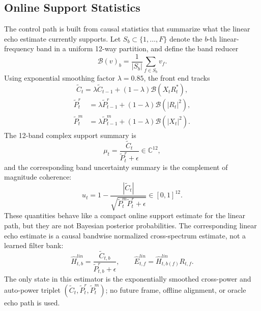 \documentclass[journal]{IEEEtran}
\begin{document}
\subsection{Online Support Statistics}
The control path is built from causal statistics that summarize what the linear echo estimate currently supports. Let $S_b \subset \{1,\ldots,F\}$ denote the $b$-th linear-frequency band in a uniform 12-way partition, and define the band reducer
\begin{equation}
\mathcal{B}(v)_b = \frac{1}{|S_b|}\sum_{f \in S_b} v_f.
\end{equation}
Using exponential smoothing factor $\lambda = 0.85$, the front end tracks
\begin{equation}
\tilde{C}_t = \lambda \tilde{C}_{t-1} + (1-\lambda)\mathcal{B}(X_t R_t^\ast),
\end{equation}
\begin{equation}
\begin{aligned}
\tilde{P}_t^r &= \lambda \tilde{P}_{t-1}^r + (1-\lambda)\mathcal{B}(|R_t|^2),\\
\tilde{P}_t^m &= \lambda \tilde{P}_{t-1}^m + (1-\lambda)\mathcal{B}(|X_t|^2).
\end{aligned}
\end{equation}
The 12-band complex support summary is
\begin{equation}
\mu_t = \frac{\tilde{C}_t}{\tilde{P}_t^r + \epsilon} \in \mathbb{C}^{12},
\end{equation}
and the corresponding band uncertainty summary is the complement of magnitude coherence:
\begin{equation}
u_t = 1 - \frac{|\tilde{C}_t|}{\sqrt{\tilde{P}_t^m \tilde{P}_t^r + \epsilon}}
\in [0,1]^{12}.
\end{equation}
These quantities behave like a compact online support estimate for the linear path, but they are not Bayesian posterior probabilities.
The corresponding linear echo estimate is a causal bandwise normalized cross-spectrum estimate, not a learned filter bank:
\begin{equation}
\hat{H}_{t,b}^{lin}=\frac{\tilde{C}_{t,b}}{\tilde{P}_{t,b}^{r}+\epsilon},
\qquad
\hat{E}^{lin}_{t,f}=\hat{H}^{lin}_{t,b(f)}R_{t,f}.
\end{equation}
The only state in this estimator is the exponentially smoothed cross-power and auto-power triplet
$(\tilde{C}_t,\tilde{P}_t^r,\tilde{P}_t^m)$; no future frame, offline alignment, or oracle echo path is used.
\end{document}
